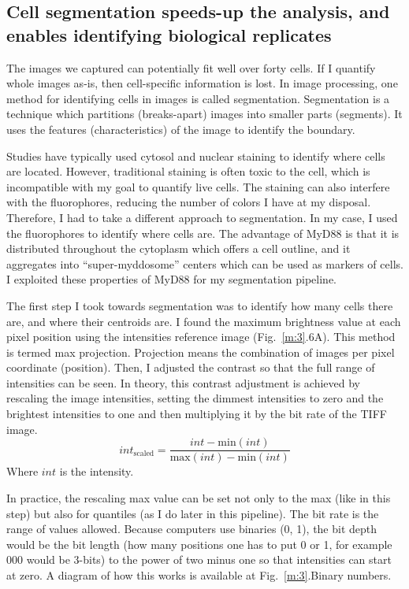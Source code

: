 \subsection{Cell segmentation speeds-up the analysis, and enables identifying biological replicates}
The images we captured can potentially fit well over forty cells. If I quantify whole images as-is, then cell-specific information is lost. In image processing, one method for identifying cells in images is called segmentation. Segmentation is a technique which partitions (breaks-apart) images into smaller parts (segments). It uses the features (characteristics) of the image to identify the boundary.

Studies have typically used cytosol and nuclear staining to identify where cells are located. However, traditional staining is often toxic to the cell, which is incompatible with my goal to quantify live cells. The staining can also interfere with the fluorophores, reducing the number of colors I have at my disposal. Therefore, I had to take a different approach to segmentation. In my case, I used the fluorophores to identify where cells are. The advantage of MyD88 is that it is distributed throughout the cytoplasm which offers a cell outline, and it aggregates into “super-myddosome” centers which can be used as markers of cells. I exploited these properties of MyD88 for my segmentation pipeline.

The first step I took towards segmentation was to identify how many cells there are, and where their centroids are. I found the maximum brightness value at each pixel position using the intensities reference image (Fig.~\ref{m:3}.6A). This method is termed max projection. Projection means the combination of images per pixel coordinate (position). Then, I adjusted the contrast so that the full range of intensities can be seen. In theory, this contrast adjustment is achieved by rescaling the image intensities, setting the dimmest intensities to zero and the brightest intensities to one and then multiplying it by the bit rate of the TIFF image.
 \begin{equation*}
int_\text{scaled} = \frac{int - \text{min}(int)}{\text{max}(int)- \text{min}(int)}
\end{equation*}
Where $int$ is the intensity.

In practice, the rescaling max value can be set not only to the max (like in this step) but also for quantiles (as I do later in this pipeline). The bit rate is the range of values allowed. Because computers use binaries (0, 1), the bit depth would be the bit length (how many positions one has to put 0 or 1, for example 000 would be 3-bits) to the power of two minus one so that intensities can start at zero. A diagram of how this works is available at Fig.~\ref{m:3}.Binary numbers.


